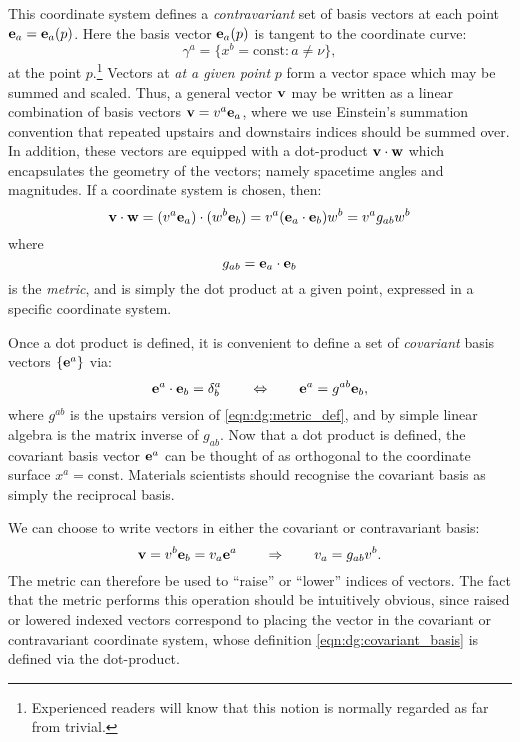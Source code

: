 This coordinate system defines a {\em contravariant\/} set of basis vectors at each point $\mathbf{e}_a = \mathbf{e}_a(p)$. Here the basis vector $\mathbf{e}_a(p)$ is tangent to the coordinate curve:
\begin{equation}
  \gamma^a = \{x^b=\mathrm{const} : a\ne \nu\},
  \label{eqn:dg:coordinate_curve}
\end{equation}
at the point $p$.\footnote{Experienced readers will know that this notion is normally regarded as far from trivial.}
  Vectors at {\em at a given point\/} $p$ form a vector space which may be summed and scaled. Thus, a general vector $\mathbf{v}$ may be written as a linear combination of basis vectors $\mathbf{v} = v^a \mathbf{e}_a$, where we use Einstein's summation convention that repeated upstairs and downstairs indices should be summed over. In addition, these vectors are equipped with a dot-product $\mathbf{v}\cdot\mathbf{w}$ which encapsulates the geometry of the vectors; namely spacetime angles and magnitudes. If a coordinate system is chosen, then:
\begin{equation}
  \mathbf{v}\cdot\mathbf{w} = (v^a\mathbf{e}_a)\cdot(w^b\mathbf{e}_b) = v^a (\mathbf{e}_a\cdot\mathbf{e}_b)w^b =  v^a g_{ab} w^b
  \label{eqn:dg:dot_product}
\end{equation}
where 
\begin{equation}
  g_{ab} = \mathbf{e}_a\cdot\mathbf{e}_b
  \label{eqn:dg:metric_def}
\end{equation}
is the {\em metric}, and is simply the dot product at a given point, expressed in a specific coordinate system.

Once a dot product is defined, it is convenient to define a set of {\em covariant\/} basis vectors $\{\mathbf{e}^a\}$ via:
\begin{equation}
  \mathbf{e}^a \cdot \mathbf{e}_b = \delta^a_b 
  \qquad\Leftrightarrow\qquad
  \mathbf{e}^a = g^{ab} \mathbf{e}_b,
  \label{eqn:dg:covariant_basis}
\end{equation}
where $g^{ab}$ is the upstairs version of \eqref{eqn:dg:metric_def}, and by simple linear algebra is the matrix inverse of $g_{ab}$. Now that a dot product is defined, the covariant basis vector $\mathbf{e}^a$ can be thought of as orthogonal to the coordinate surface $x^a=\mathrm{const}$. Materials scientists should recognise the covariant basis as simply the reciprocal basis. 

We can choose to write vectors in either the covariant or contravariant basis:
\begin{equation}
  \mathbf{v}=v^b \mathbf{e}_b = v_a \mathbf{e}^a 
  \qquad\Rightarrow\qquad
  v_a = g_{ab} v^b.
  \label{eqn:dg:covariant_vector}
\end{equation}
The metric can therefore be used to ``raise'' or ``lower'' indices of vectors. The fact that the metric performs this operation should be intuitively obvious, since raised or lowered indexed vectors correspond to placing the vector in the covariant or contravariant coordinate system, whose definition \eqref{eqn:dg:covariant_basis} is defined via the dot-product.

